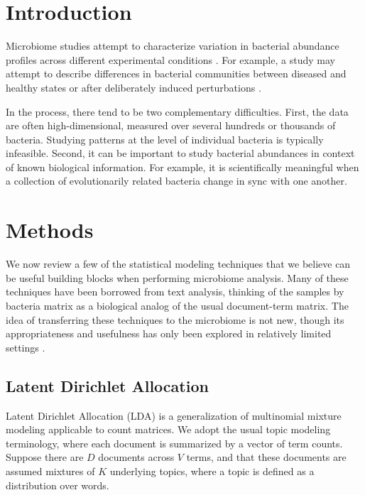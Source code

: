 \documentclass[oupdraft]{bio}
\begin{document}
\section{Introduction}

Microbiome studies attempt to characterize variation in bacterial abundance
profiles across different experimental conditions \citep{human2012structure}.
For example, a study may attempt to describe differences in bacterial
communities between diseased and healthy states or after deliberately induced
perturbations \citep{dethlefsen2011incomplete}.

In the process, there tend to be two complementary difficulties. First, the data
are often high-dimensional, measured over several hundreds or thousands of
bacteria. Studying patterns at the level of individual bacteria is typically
infeasible. Second, it can be important to study bacterial abundances in context
of known biological information. For example, it is scientifically meaningful
when a collection of evolutionarily related bacteria change in sync with one
another.

\section{Methods}

We now review a few of the statistical modeling techniques that we believe can
be useful building blocks when performing microbiome analysis. Many of these
techniques have been borrowed from text analysis, thinking of the samples by
bacteria matrix as a biological analog of the usual document-term matrix. The
idea of transferring these techniques to the microbiome is not new, though its
appropriateness and usefulness has only been explored in relatively limited
settings \citep{shafiei2015biomico, chen2012estimating, holmes2012dirichlet,
  chen2013variable}.

\subsection{Latent Dirichlet Allocation}

Latent Dirichlet Allocation (LDA) is a generalization of multinomial mixture
modeling applicable to count matrices. We adopt the usual topic modeling
terminology, where each document is summarized by a vector of term counts.
Suppose there are $D$ documents across $V$ terms, and that these documents are
assumed mixtures of $K$ underlying topics, where a topic is defined as a
distribution over words.
\end{document}
